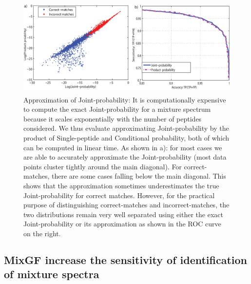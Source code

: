 \documentclass[runningheads,a4paper]{llncs}
\begin{document}
\begin{figure}
	\centering
	 \includegraphics[height=50mm, width=120mm]{figures/MixGF_approx_joint_by_product_distrib_plus_ROC.eps}
		\caption{Approximation of Joint-probability:
	It is computationally expensive to compute the exact Joint-probability for a mixture spectrum because it scales exponentially with the number of peptides considered. We thus evaluate approximating Joint-probability by the product of Single-peptide and Conditional probability, both of which can be computed in linear time. As shown in a): for most cases we are able to accurately approximate the Joint-probability (most data points cluster tightly around the main diagonal).  For correct-matches, there are some cases falling below the main diagonal. This shows that the approximation sometimes underestimates the true Joint-probability for correct matches.  However, for the practical purpose of distinguishing correct-matches and incorrect-matches, the two distributions remain very well separated using either the exact Joint-probability or its approximation as shown in the ROC curve on the right.}
\label{approximate}
\end{figure}

\subsection*{MixGF increase the sensitivity of identification of mixture spectra}

\end{document}
